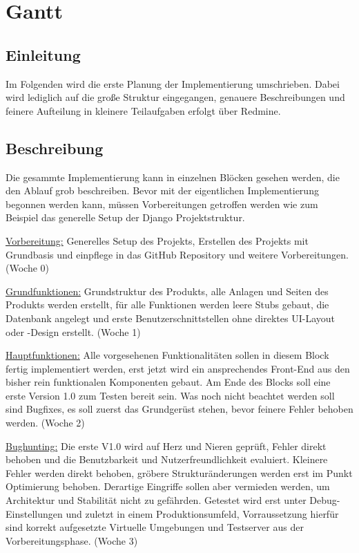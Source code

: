 \chapter{Gantt}

\section{Einleitung}
 Im Folgenden wird die erste Planung der Implementierung umschrieben. Dabei wird lediglich auf die große Struktur eingegangen, genauere Beschreibungen und feinere Aufteilung in kleinere Teilaufgaben erfolgt über Redmine.

\section{Beschreibung}
Die gesammte Implementierung kann in einzelnen Blöcken gesehen werden, die den Ablauf grob beschreiben. Bevor mit der eigentlichen Implementierung begonnen werden kann, müssen Vorbereitungen getroffen werden wie zum Beispiel das generelle Setup der Django Projektstruktur.

\underline{Vorbereitung:} Generelles Setup des Projekts, Erstellen des Projekts mit Grundbasis und einpflege in das GitHub Repository und weitere Vorbereitungen. (Woche 0)

\underline{Grundfunktionen:} Grundstruktur des Produkts, alle Anlagen und Seiten des Produkts werden erstellt, für alle Funktionen werden leere Stubs gebaut, die Datenbank angelegt und erste Benutzerschnittstellen ohne direktes UI-Layout oder -Design erstellt. (Woche 1)

\underline{Hauptfunktionen:} Alle vorgesehenen Funktionalitäten sollen in diesem Block fertig implementiert werden, erst jetzt wird ein ansprechendes Front-End aus den bisher rein funktionalen Komponenten gebaut. Am Ende des Blocks soll eine erste Version 1.0 zum Testen bereit sein. Was noch nicht beachtet werden soll sind Bugfixes, es soll zuerst das Grundgerüst stehen, bevor feinere Fehler behoben werden. (Woche 2)

\underline{Bughunting:} Die erste V1.0 wird auf Herz und Nieren geprüft, Fehler direkt behoben und die Benutzbarkeit und Nutzerfreundlichkeit evaluiert. Kleinere Fehler werden direkt behoben, gröbere Strukturänderungen werden erst im Punkt Optimierung behoben. Derartige Eingriffe sollen aber vermieden werden, um Architektur und Stabilität nicht zu gefährden. Getestet wird erst unter Debug-Einstellungen und zuletzt in einem Produktionsumfeld, Vorraussetzung hierfür sind korrekt aufgesetzte Virtuelle Umgebungen und Testserver aus der Vorbereitungsphase. (Woche 3)

